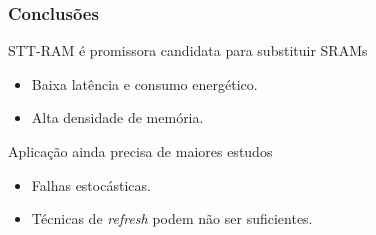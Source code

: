 \documentclass[10pt, pdf,xcolor=pdftex,dvipsnames,table]{beamer}
\begin{document}
\frame
{
\frametitle{Conclusões}
		\begin{block}{STT-RAM é promissora candidata para substituir SRAMs}
			\begin{itemize}
				\item Baixa latência e consumo energético.
				\item Alta densidade de memória.
			\end{itemize}	 
		\end{block}
		\begin{block}{Aplicação ainda precisa de maiores estudos}
			\begin{itemize}
				\item Falhas estocásticas.				
				\item Técnicas de \textit{refresh} podem não ser suficientes.
			\end{itemize}
		\end{block}
}


\titlepage
\end{document}
